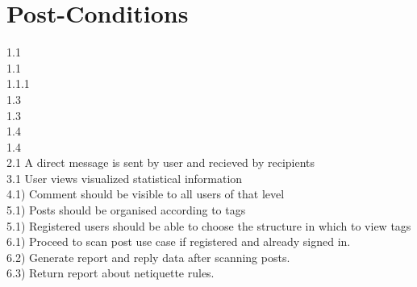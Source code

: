 \documentclass{scrreprt}
\begin{document}
\section{Post-Conditions}								%
1.1\\
1.1\\
1.1.1\\
1.3\\
1.3\\
1.4\\
1.4\\
2.1 A direct message is sent by user and recieved by recipients\\
3.1 User views visualized statistical information\\
4.1) Comment should be visible to all users of that level\\
5.1) Posts should be organised according to tags\\
5.1) Registered users should be able to choose the structure in which to view tags\\
6.1) Proceed to scan post use case if registered and already signed in.\\
6.2) Generate report and reply data after scanning posts.\\
6.3) Return report about netiquette rules.\\
\end{document}
